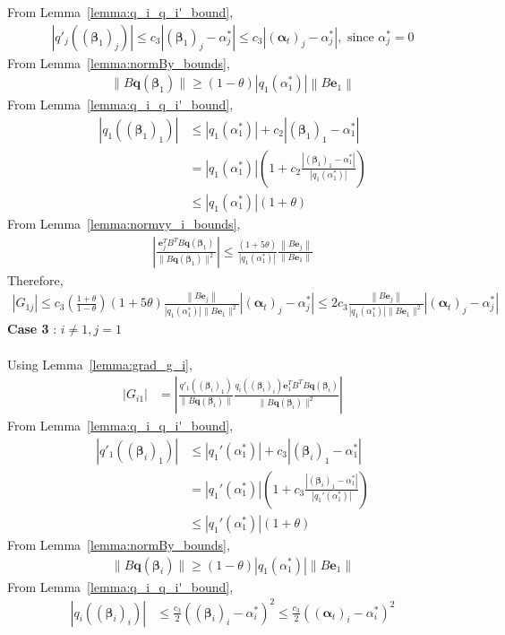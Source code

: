 \documentclass[letterpaper]{article}
\newcommand{\bas}[1]{\begin{align*}#1\end{align*}}
\newcommand{\balpha}{\pmb{\alpha}}
\newcommand{\be}{\pmb{e}}
\newcommand{\bbeta}{\pmb{\beta}}
\newcommand{\bq}{\pmb{q}}
\newcommand{\bb}[1]{\left(#1\right)}
\begin{document}
From Lemma~\ref{lemma:q_i_q_i'_bound},
\bas{
    \left|q'_{j}\bb{\bb{\bbeta_{1}}_{j}}\right| \leq c_{3}\left|\bb{\bbeta_{1}}_{j} - \alpha^{*}_{j}\right| \leq c_{3}\left|\bb{\balpha_{t}}_{j} - \alpha^{*}_{j}\right|, \text{ since } \alpha^{*}_{j} = 0
}
From Lemma~\ref{lemma:normBy_bounds}, 
\bas{
    \|B\bq\bb{\bbeta_{1}}\| \geq \bb{1-\theta}\left|q_{1}\bb{\alpha^{*}_{1}}\right|\left\|B\be_{1}\right\|
}
From Lemma~\ref{lemma:q_i_q_i'_bound}, 
\bas{
    \left|q_{1}\bb{\bb{\bbeta_{1}}_{1}}\right| &\leq \left|q_{1}\bb{\alpha^{*}_{1}}\right| + c_{2}\left|\bb{\bbeta_{1}}_{1} - \alpha^{*}_{1}\right| \\ 
    &= \left|q_{1}\bb{\alpha^{*}_{1}}\right|\bb{1 + c_{2}\frac{\left|\bb{\bbeta_{1}}_{1} - \alpha^{*}_{1}\right|}{\left|q_{1}\bb{\alpha^{*}_{1}}\right|}} \\ 
    &\leq \left|q_{1}\bb{\alpha^{*}_{1}}\right|\bb{1 + \theta}
}
From Lemma~\ref{lemma:normvy_i_bounds}, 
\bas{
    \left|\frac{\be_{j}^{T}B^{T}B\bq\bb{\bbeta_{1}}}{\|B\bq\bb{\bbeta_{1}}\|^{2}}\right| \leq \frac{\bb{1+5\theta}}{|q_{1}\bb{\alpha^{*}_{1}}|}\frac{\left\|B\be_{j}\right\|}{\|B\be_{1}\|}
}
Therefore, 
\bas{
    \left|G_{1j}\right| \leq c_{3}\bb{\frac{1+\theta}{1-\theta}}\bb{1+5\theta}\frac{\left\|B\be_{j}\right\|}{|q_{1}\bb{\alpha^{*}_{1}}|\|B\be_{1}\|^{2}}\left|\bb{\balpha_{t}}_{j} - \alpha^{*}_{j}\right| \leq 2c_{3}\frac{\left\|B\be_{j}\right\|}{|q_{1}\bb{\alpha^{*}_{1}}|\|B\be_{1}\|^{2}}\left|\bb{\balpha_{t}}_{j} - \alpha^{*}_{j}\right|
}
\textbf{Case 3} : $i \neq 1, j=1$ \\ \\
Using Lemma~\ref{lemma:grad_g_i},
\bas{
    \left|G_{i1}\right| &= \left|\frac{q'_{1}\bb{\bb{\bbeta_{i}}_{1}}}{\|B\bq\bb{\bbeta_{i}}\|}\frac{q_{i}\bb{\bb{\bbeta_{i}}_{i}}\be_{1}^{T}B^{T}B\bq\bb{\bbeta_{i}}}{\|B\bq\bb{\bbeta_{i}}\|^{2}}\right|
}
From Lemma~\ref{lemma:q_i_q_i'_bound},
\bas{
    \left|q'_{1}\bb{\bb{\bbeta_{i}}_{1}}\right| &\leq \left|q_{1}'\bb{\alpha^{*}_{1}}\right| + c_{3}\left|\bb{\bbeta_{i}}_{1} - \alpha^{*}_{1}\right| \\ 
    &= \left|q_{1}'\bb{\alpha^{*}_{1}}\right|\bb{1 + c_{3}\frac{\left|\bb{\bbeta_{i}}_{1} - \alpha^{*}_{1}\right|}{\left|q_{1}'\bb{\alpha^{*}_{1}}\right|}} \\ 
    &\leq \left|q_{1}'\bb{\alpha^{*}_{1}}\right|\bb{1 + \theta}
}
From Lemma~\ref{lemma:normBy_bounds}, 
\bas{
    \|B\bq\bb{\bbeta_{i}}\| \geq \bb{1-\theta}\left|q_{1}\bb{\alpha^{*}_{1}}\right|\left\|B\be_{1}\right\|
}
From Lemma~\ref{lemma:q_i_q_i'_bound}, 
\bas{
    \left|q_{i}\bb{\bb{\bbeta_{i}}_{i}}\right| &\leq \frac{c_{3}}{2}\bb{\bb{\bbeta_{i}}_{i} - \alpha^{*}_{i}}^{2} \leq \frac{c_{3}}{2}\bb{\bb{\balpha_{t}}_{i} - \alpha^{*}_{i}}^{2}
}
\end{document}
